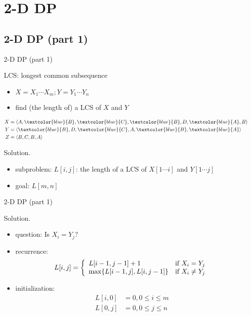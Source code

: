 \section{2-D DP}

\subsection{2-D DP (part 1)}
\begin{frame}{2-D DP (part 1)}
  \begin{exampleblock}{LCS: longest common subsequence }
    \begin{itemize}
      \item $X = X_{1} \cdots X_{m}; Y = Y_{1} \cdots Y_{n}$
      \item find (the length of) a LCS of $X$ and $Y$
    \end{itemize}
    \begin{align*}
      X &= \langle A,\textcolor{blue}{B},\textcolor{blue}{C},\textcolor{blue}{B},D,\textcolor{blue}{A},B \rangle  \\
      Y &= \langle \textcolor{blue}{B},D,\textcolor{blue}{C},A,\textcolor{blue}{B},\textcolor{blue}{A} \rangle \\
      Z &= \langle B,C,B,A \rangle
    \end{align*}
  \end{exampleblock}

  \begin{block}{Solution.}
    \begin{itemize}
      \item subproblem: $L[i,j]$: the length of a LCS of $X[1 \cdots i]$ and $Y[1 \cdots j]$
      \item goal: $L[m,n]$
    \end{itemize}
  \end{block}
\end{frame}
\begin{frame}{2-D DP (part 1)}
  \begin{block}{Solution.}
    \begin{itemize}
      \item question: Is $X_{i} = Y_{j}$?
      \item recurrence:
	\begin{displaymath}
	  L[i,j] = \left\{ \begin{array}{ll}
	    L[i-1, j-1] + 1 & \textrm{if $X_{i} = Y_{j}$}\\
	    \max \{L[i-1,j], L[i,j-1]\} & \textrm{if $X_{i} \neq Y_{j}$}
	  \end{array} \right.
	\end{displaymath}
      \item initialization:
	\begin{align*}
	  L[i,0] &= 0, 0 \le i \le m \\
	  L[0,j] &= 0, 0 \le j \le n
	\end{align*}
    \end{itemize}
  \end{block}
\end{frame}
